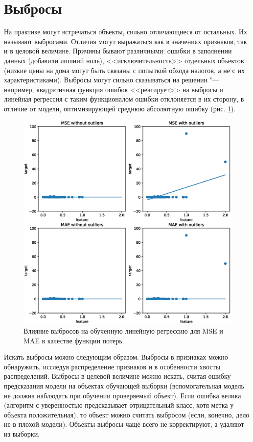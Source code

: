 \documentclass[12pt,fleqn]{article}
\begin{document}
\section{Выбросы}


На практике могут встречаться объекты, сильно отличающиеся от остальных. Их называют выбросами. Отличия могут выражаться как в значениях признаков, так и в целовой величине. Причины бывают различными: ошибки в заполнении данных (добавили лишний ноль), <<исключительность>> отдельных объектов (низкие цены на дома могут быть связаны с попыткой обхода налогов, а не с их характеристиками). Выбросы могут сильно сказываться на решении "--- например, квадратичная функция ошибок <<реагирует>> на выбросы и линейная регрессия с таким функционалом ошибки отклоняется в их сторону, в отличие от модели, оптимизирующей среднюю абсолютную ошибку (рис. \ref{fig:outliers}).

\begin{center}
    \begin{figure}[!htb]
        \centering
        \includegraphics[width=0.8\linewidth]{outliers.eps}
        \caption{Влияние выбросов на обученную линейную регрессию для MSE и MAE в качестве функции потерь.}\label{fig:outliers}
    \end{figure}
\end{center}

Искать выбросы можно следующим образом. Выбросы в признаках можно обнаружить, исследуя распределение признаков и в особенности хвосты распределений. Выбросы в целевой величине можно искать, считая ошибку предсказания модели на объектах обучающей выборки (вспомогательная модель не должна наблюдать при обучении проверяемый объект). Если ошибка велика (алгоритм с уверенностью предсказывает отрицательный класс, хотя метка у объекта положительная), то объект можно считать выбросом (если, конечно, дело не в плохой модели). Объекты-выбросы чаще всего не корректируют, а удаляют из выборки.
\end{document}
